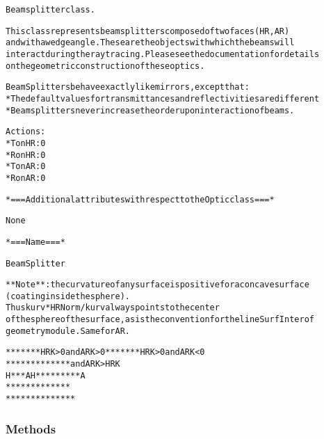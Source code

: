 \begin{alltt}


Beamsplitter class.

This class represents beam splitters composed of two faces (HR, AR)
and with a wedge angle. These are the objects with which the beams will
interact during the ray tracing. Please see the documentation for details
on the geometric construction of these optics.

Beam Splitters behave exactly like mirrors, except that:
    * The default values for transmittances and reflectivities are different
    * Beam splitters never increase the order upon interaction of beams.

Actions:
    * T on HR: 0
    * R on HR: 0
    * T on AR: 0
    * R on AR: 0

*=== Additional attributes with respect to the Optic class ===*

None

*=== Name ===*

BeamSplitter

**Note**: the curvature of any surface is positive for a concave surface
(coating inside the sphere).
Thus kurv*HRNorm/{\textbar}kurv{\textbar} always points to the center
of the sphere of the surface, as is the convention for the lineSurfInter of
geometry module. Same for AR.

*******     HRK {\textgreater} 0 and ARK {\textgreater} 0     *******           HRK {\textgreater} 0 and ARK {\textless} 0
 *****                               ********         and {\textbar}ARK{\textbar} {\textgreater} {\textbar}HRK{\textbar}
 H***A                               H*********A
 *****                               ********
*******                             *******
\end{alltt}



  \subsubsection{Methods}

    \vspace{0.5ex}

